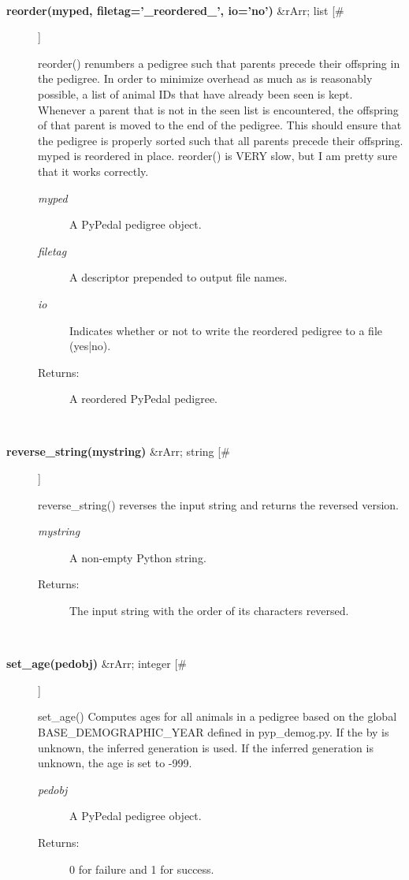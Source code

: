 \documentclass[10pt]{article}
\begin{document}
\begin{description}
\begin{description}
\end{description}
\\ 

\item[\textbf{reorder(myped, filetag='\_reordered\_', io='no')}
 \&rArr; list [\#]]

 reorder() renumbers a pedigree such that parents precede their offspring in the pedigree. In order to minimize overhead as much as is reasonably possible, a list of animal IDs that have already been seen is kept. Whenever a parent that is not in the seen list is encountered, the offspring of that parent is moved to the end of the pedigree. This should ensure that the pedigree is properly sorted such that all parents precede their offspring. myped is reordered in place. reorder() is VERY slow, but I am pretty sure that it works correctly.
\begin{description}
\item[\emph{myped}
] A PyPedal pedigree object.
\item[\emph{filetag}
] A descriptor prepended to output file names.
\item[\emph{io}
] Indicates whether or not to write the reordered pedigree to a file (yes|no).
\item[Returns:] A reordered PyPedal pedigree.

\end{description}
\\ 

\item[\textbf{reverse\_string(mystring)}
 \&rArr; string [\#]]

 reverse\_string() reverses the input string and returns the reversed version.
\begin{description}
\item[\emph{mystring}
] A non-empty Python string.
\item[Returns:] The input string with the order of its characters reversed.

\end{description}
\\ 

\item[\textbf{set\_age(pedobj)}
 \&rArr; integer [\#]]

 set\_age() Computes ages for all animals in a pedigree based on the global BASE\_DEMOGRAPHIC\_YEAR defined in pyp\_demog.py. If the by is unknown, the inferred generation is used. If the inferred generation is unknown, the age is set to -999.
\begin{description}
\item[\emph{pedobj}
] A PyPedal pedigree object.
\item[Returns:] 0 for failure and 1 for success.


\end{description}
\end{description}
\end{document}
